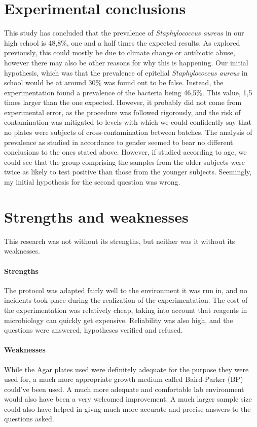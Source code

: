 \section{Experimental conclusions}
This study has concluded that the prevalence of \emph{Staphylococcus aureus} in our high school is 48,8\%, one and a half times the expected results. As explored previously, this could mostly be due to climate change or antibiotic abuse, however there may also be other reasons for why this is happening. Our initial hypothesis, which was that the prevalence of epitelial \emph{Staphylococcus aureus} in school would be at around 30\% was found out to be false. Instead, the experimentation found a prevalence of the bacteria being 46,5\%. This value, 1,5 times larger than the one expected. However, it probably did not come from experimental error, as the procedure was followed rigorously, and the risk of contamination was mitigated to levels with which we could confidently say that no plates were subjects of cross-contamination between batches.\newline
The analysis of prevalence as studied in accordance to gender seemed to bear no different conclusions to the ones stated above. However, if studied according to age, we could see that the group comprising the samples from the older subjects were twice as likely to test positive than those from the younger subjects. Seemingly, my initial hypothesis for the second question was wrong.
\section{Strengths and weaknesses}
This research was not without its strengths, but neither was it without its weaknesses.
\paragraph{Strengths} The protocol was adapted fairly well to the environment it was run in, and no incidents took place during the realization of the experimentation. The cost of the experimentation was relatively cheap, taking into account that reagents in microbiology can quickly get expensive. Reliability was also high, and the questions were answered, hypotheses verified and refused.
\paragraph{Weaknesses} While the Agar plates used were definitely adequate for the purpose they were used for, a much more appropriate growth medium called Baird-Parker (BP) could've been used. A much more adequate and comfortable lab environment would also have been a very welcomed improvement. A much larger sample size could also have helped in givng much more accurate and precise answers to the questions asked.
